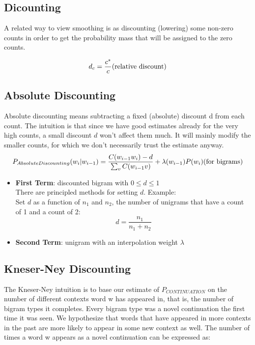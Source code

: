 \subsection{Dicounting \cite{nlp-1}}
A related way to view smoothing is as discounting (lowering) some non-zero counts in order to get the probability mass that will be assigned to the zero counts.


\[
    d_c = \displaystyle\frac{c^*}{c}  \hfill \text{(relative discount)}
\]

\subsection{Absolute Discounting}
Absolute discounting means subtracting a fixed (absolute) discount d from each count. The intuition is that since we have good estimates already for the very high counts, a small discount $d$ won’t affect them much. It will mainly modify the smaller counts, for which we don’t necessarily trust the estimate anyway. 
\[
    P_{AbsoluteDiscounting}(w_i|w_{i-1}) = \displaystyle\frac{C(w_{i-1}w_i)-d}{\sum_v C(w_{i-1} v)} + \lambda (w_{i-1})P(w_i) \hfill \text{(for bigrams)}
\]

\begin{itemize}
    \item \textbf{First Term}: discounted bigram with $0 \leq d \leq 1$\\
    There are principled methods for setting $d$. Example:\\
    Set $d$ as a function of $n_1$ and $n_2$, the number of unigrams that have a count of 1 and a count of 2:\\
    \[
        d = \displaystyle\frac{n_1}{n_1 + n_2}
    \]
    \item \textbf{Second Term}: unigram with an interpolation weight $\lambda$
\end{itemize}

\subsection{Kneser-Ney Discounting}\label{Kneser-Ney Discounting}
The Kneser-Ney intuition is to base our estimate of $P_{CONTINUATION}$ on the number of different contexts word w has appeared in, that is, the number of bigram types it completes. Every bigram type was a novel continuation the first time it was seen. We hypothesize that words that have appeared in more contexts in the
past are more likely to appear in some new context as well. The number of times a word w appears as a novel continuation can be expressed as:

